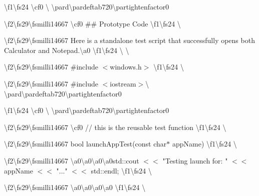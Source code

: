 \textbackslash{}f1\textbackslash{}fs24 \textbackslash{}cf0 \textbackslash{} \textbackslash{}pard\textbackslash{}pardeftab720\textbackslash{}partightenfactor0

\textbackslash{}f2\textbackslash{}fs29\textbackslash{}fsmilli14667 \textbackslash{}cf0 \#\# Prototype Code \textbackslash{}f1\textbackslash{}fs24 \textbackslash{}

\textbackslash{}f2\textbackslash{}fs29\textbackslash{}fsmilli14667 Here is a standalone test script that successfully opens both Calculator and Notepad.\textbackslash{}\textquotesingle{}a0 \textbackslash{}f1\textbackslash{}fs24 \textbackslash{} \textbackslash{}

\textbackslash{}f2\textbackslash{}fs29\textbackslash{}fsmilli14667 \+\#include \texorpdfstring{$<$}{<}windows.\+h\texorpdfstring{$>$}{>} \textbackslash{}f1\textbackslash{}fs24 \textbackslash{}

\textbackslash{}f2\textbackslash{}fs29\textbackslash{}fsmilli14667 \+\#include $<$iostream$>$\textbackslash{} \textbackslash{}pard\textbackslash{}pardeftab720\textbackslash{}partightenfactor0

\textbackslash{}f1\textbackslash{}fs24 \textbackslash{}cf0 \textbackslash{} \textbackslash{}pard\textbackslash{}pardeftab720\textbackslash{}partightenfactor0

\textbackslash{}f2\textbackslash{}fs29\textbackslash{}fsmilli14667 \textbackslash{}cf0 /\+/\+ this is the reusable test function \textbackslash{}f1\textbackslash{}fs24 \textbackslash{}

\textbackslash{}f2\textbackslash{}fs29\textbackslash{}fsmilli14667 bool launch\+App\+Test(const char\texorpdfstring{$\ast$}{*} app\+Name) \textbackslash{}f1\textbackslash{}fs24 \textbackslash{}

\textbackslash{}f2\textbackslash{}fs29\textbackslash{}fsmilli14667 \textbackslash{}\textquotesingle{}a0\textbackslash{}\textquotesingle{}a0\textbackslash{}\textquotesingle{}a0\textbackslash{}\textquotesingle{}a0std::\+cout \texorpdfstring{$<$}{<}\texorpdfstring{$<$}{<} "{}\+Testing launch for:\+ "{} \texorpdfstring{$<$}{<}\texorpdfstring{$<$}{<} app\+Name \texorpdfstring{$<$}{<}\texorpdfstring{$<$}{<} "{}..."{} \texorpdfstring{$<$}{<}\texorpdfstring{$<$}{<} std::\+endl; \textbackslash{}f1\textbackslash{}fs24 \textbackslash{}

\textbackslash{}f2\textbackslash{}fs29\textbackslash{}fsmilli14667 \textbackslash{}\textquotesingle{}a0\textbackslash{}\textquotesingle{}a0\textbackslash{}\textquotesingle{}a0\textbackslash{}\textquotesingle{}a0 \textbackslash{}f1\textbackslash{}fs24 \textbackslash{}

